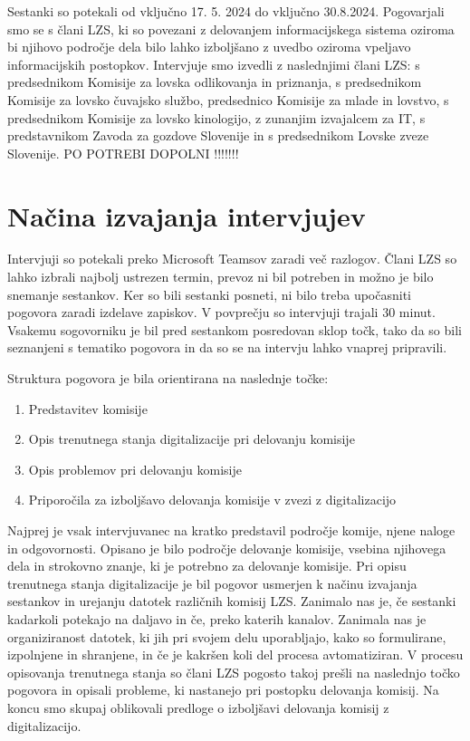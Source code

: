 \documentclass[a4paper,12pt,openright]{book}
\begin{document}
Sestanki so potekali od vključno 17. 5. 2024 do vključno 30.8.2024. 
Pogovarjali smo se s člani LZS, ki so povezani z delovanjem informacijskega sistema oziroma bi njihovo področje dela bilo lahko izboljšano z uvedbo oziroma vpeljavo informacijskih postopkov.
Intervjuje smo izvedli z naslednjimi člani LZS: s predsednikom Komisije za lovska odlikovanja in priznanja, s predsednikom Komisije za lovsko čuvajsko službo, predsednico Komisije za mlade in lovstvo, s predsednikom Komisije za lovsko kinologijo, z zunanjim izvajalcem za IT, s predstavnikom Zavoda za gozdove Slovenije in s predsednikom Lovske zveze Slovenije. 
PO POTREBI DOPOLNI !!!!!!!

\section{Načina izvajanja intervjujev}

Intervjuji so potekali preko Microsoft Teamsov zaradi več razlogov. 
Člani LZS so lahko izbrali najbolj ustrezen termin, prevoz ni bil potreben in možno je bilo snemanje sestankov.
Ker so bili sestanki posneti, ni bilo treba upočasniti pogovora zaradi izdelave zapiskov.
V povprečju so intervjuji trajali 30 minut.
Vsakemu sogovorniku je bil pred sestankom posredovan sklop točk, tako da so bili seznanjeni s tematiko pogovora in da so se na intervju lahko vnaprej pripravili. 

Struktura pogovora je bila orientirana na naslednje točke:
\begin{enumerate}
    \item Predstavitev komisije
    \item Opis trenutnega stanja digitalizacije pri delovanju komisije
    \item Opis problemov pri delovanju komisije
    \item Priporočila za izboljšavo delovanja komisije v zvezi z digitalizacijo
\end{enumerate}


Najprej je vsak intervjuvanec na kratko predstavil področje komije, njene naloge in odgovornosti. 
Opisano je bilo področje delovanje komisije, vsebina njihovega dela in strokovno znanje, ki je potrebno za delovanje komisije. 
Pri opisu trenutnega stanja digitalizacije je bil pogovor usmerjen k načinu izvajanja sestankov in urejanju datotek različnih komisij LZS. 
Zanimalo nas je, če sestanki kadarkoli potekajo na daljavo in če, preko katerih kanalov. 
Zanimala nas je organiziranost datotek, ki jih pri svojem delu uporabljajo, kako so formulirane, izpolnjene in shranjene, in če je kakršen koli del procesa avtomatiziran.
V procesu opisovanja trenutnega stanja so člani LZS pogosto takoj prešli na naslednjo točko pogovora in opisali probleme, ki nastanejo pri postopku delovanja komisij. 
Na koncu smo skupaj oblikovali predloge o izboljšavi delovanja komisij z digitalizacijo. 
\end{document}
